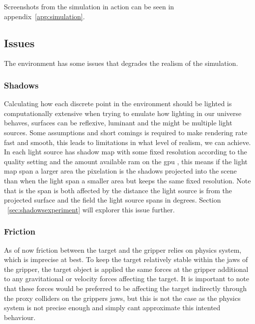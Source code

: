 Screenshots from the simulation in action can be seen in appendix~\ref{app:simulation}.



%

\subsection{Issues}

The environment has some issues that degrades the realism of the simulation. 

\subsubsection{Shadows}

Calculating how each discrete point in the environment should be lighted is computationally extensive when trying to emulate how lighting in our universe behaves, surfaces can be reflexive, luminant and the might be multiple light sources. Some assumptions and short comings is required to make rendering rate fast and smooth, this leads to limitations in what level of realism, we can achieve. In \cite{unity3d} each light source has shadow map with some fixed resolution according to the quality setting and the amount available ram on the gpu \cite{unityshadowmapsize}, this means if the light map span a larger area the pixelation is the shadows projected into the scene than when the light span a smaller area but keeps the same fixed resolution. Note that is the span is both affected by the distance the light source is from the projected surface and the field the light source spans in degrees. Section ~\ref{sec:shadowsexperiment} will explorer this issue further.

\subsubsection{Friction}

As of now friction between the target and the gripper relies on \cite{unityphysics} physics system, which is imprecise at best. To keep the target relatively stable within the jaws of the gripper, the target object is applied the same forces at the gripper additional to any gravitational or velocity forces affecting the target. It is important to note that these forces would be preferred to be affecting the target indirectly through the proxy colliders on the grippers jaws, but this is not the case as the \cite{unity3d} physics system is not precise enough and simply cant approximate this intented behaviour.

